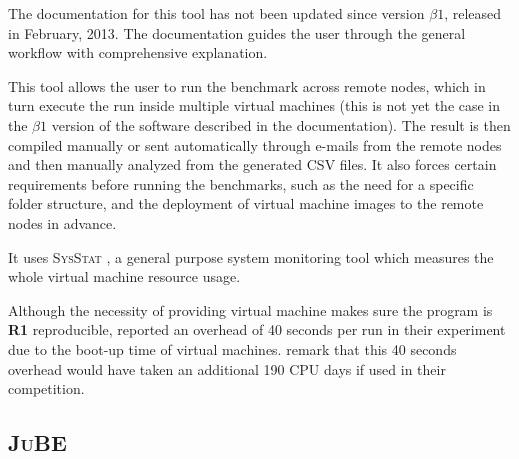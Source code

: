 The documentation for this tool has not been updated since version $\beta1$, released in February, 2013.
The documentation guides the user through the general workflow with comprehensive explanation.

This tool allows the user to run the benchmark across remote nodes, which in turn execute the run inside multiple virtual machines (this is not yet the case in the $\beta1$ version of the software described in the documentation).
The result is then compiled manually or sent automatically through e-mails from the remote nodes and then manually analyzed from the generated CSV files.
It also forces certain requirements before running the benchmarks, such as the need for a specific folder structure, and the deployment of virtual machine images to the remote nodes in advance.

It uses \textsc{SysStat} \citep{sebastienPerformanceMonitoringTools2019}, a general purpose system monitoring tool which measures the whole virtual machine resource usage.

Although the necessity of providing virtual machine makes sure the program is \textbf{R1} reproducible, \citet{kordonBenchKitToolMassive2014} reported an overhead of 40 seconds per run in their experiment due to the boot-up time of virtual machines.
\cite{beyerReliableBenchmarkingRequirements2019} remark that this 40 seconds overhead would have taken an additional 190 CPU days if used in their competition.


\subsection{\textsc{JuBE}}

